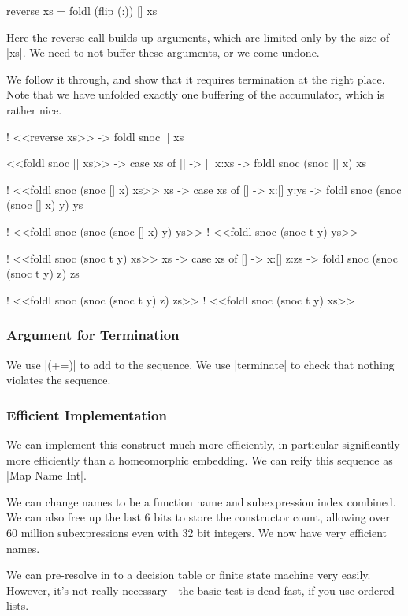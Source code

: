 \documentclass{sigplanconf}
\begin{document}
\begin{code}
reverse xs = foldl (flip (:)) [] xs
\end{code}

Here the reverse call builds up arguments, which are limited only by the size of |xs|. We need to not buffer these arguments, or we come undone.

We follow it through, and show that it requires termination at the right place. Note that we have unfolded exactly one buffering of the accumulator, which is rather nice.

\begin{code}
! <<reverse xs>>
\xs -> foldl snoc [] xs

<<foldl snoc [] xs>>
\xs -> case xs of
    [] -> []
    x:xs -> foldl snoc (snoc [] x) xs

! <<foldl snoc (snoc [] x) xs>>
\x xs -> case xs of
    [] -> x:[]
    y:ys -> foldl snoc (snoc (snoc [] x) y) ys

! <<foldl snoc (snoc (snoc [] x) y) ys>>
! <<foldl snoc (snoc t y) ys>>

! <<foldl snoc (snoc t y) xs>>
\x xs -> case xs of
    [] -> x:[]
    z:zs -> foldl snoc (snoc (snoc t y) z) zs

! <<foldl snoc (snoc (snoc t y) z) zs>>
! <<foldl snoc (snoc t y) xs>>
\end{code}


\subsubsection{Argument for Termination}

We use |(+=)| to add to the sequence. We use |terminate| to check that nothing violates the sequence.

\subsubsection{Efficient Implementation}

We can implement this construct much more efficiently, in particular significantly more efficiently than a homeomorphic embedding. We can reify this sequence as |Map Name Int|.

We can change names to be a function name and subexpression index combined. We can also free up the last 6 bits to store the constructor count, allowing over 60 million subexpressions even with 32 bit integers. We now have very efficient names.

We can pre-resolve in to a decision table or finite state machine very easily. However, it's not really necessary - the basic test is dead fast, if you use ordered lists.
\end{document}
